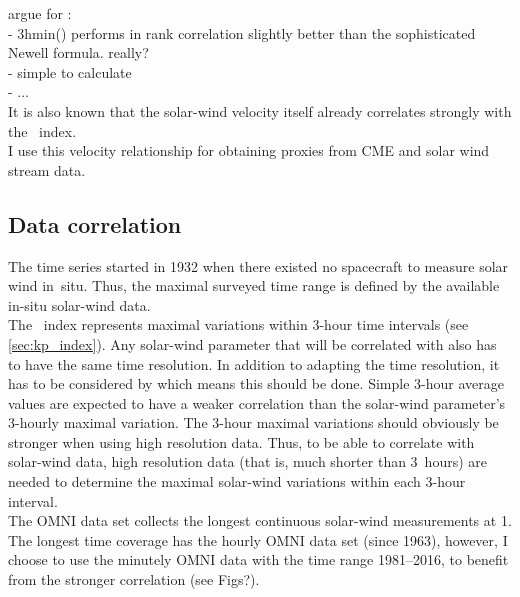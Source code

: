 argue for \vBz:\\
- 3hmin(\vBz) performs in rank correlation slightly better than the sophisticated Newell formula. really?\\
- simple to calculate\\
- ...\\

It is also known that the solar-wind velocity itself already correlates strongly with the \Kp~index.\\

I use this velocity relationship for obtaining \Kp{} proxies from CME and solar wind stream data.\\


\subsection{Data correlation}
\label{sec:data_correlation}
The \Kp{} time series started in 1932 when there existed no spacecraft to measure solar wind in~situ. Thus, the maximal surveyed time range is defined by the available in-situ solar-wind data.\\

The \Kp{}~index represents maximal variations within 3-hour time intervals (see \autoref{sec:kp_index}). Any solar-wind parameter that will be correlated with \Kp{} also has to have the same time resolution. In addition to adapting the time resolution, it has to be considered by which means this should be done. Simple 3-hour average values are expected to have a weaker correlation than the solar-wind parameter's 3-hourly maximal variation.
The 3-hour maximal variations should obviously be stronger when using high resolution data. Thus, to be able to correlate \Kp{} with solar-wind data, high resolution data (that is, much shorter than 3~hours) are needed to determine the maximal solar-wind variations within each 3-hour interval.\\

The OMNI data set collects the longest continuous solar-wind measurements at \SI{1}{\au}. The longest time coverage has the hourly OMNI data set (since 1963), however, I choose to use the minutely OMNI data with the time range 1981--2016, to benefit from the stronger correlation (see Figs?).\\

